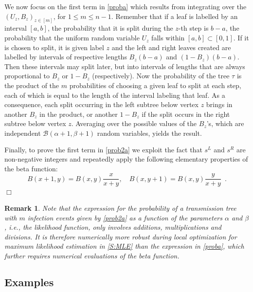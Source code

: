 \documentclass[review]{elsarticle}
\numberwithin{equation}{section}
\let\orgautoref\autoref
\renewcommand{\autoref}
        {\def\equationautorefname{Eq.}%
         \def\figureautorefname{Fig.}%
         \def\subfigureautorefname{Fig.}%
         \def\sectionautorefname{Sect.}%
         \def\subsectionautorefname{Sect.}%
         \def\subsubsectionautorefname{Sect.}%
         \def\Itemautorefname{item}%
         \def\tableautorefname{Table}%
         \def\propositionautorefname{Prop.}%
         \def\corollaryautorefname{Corollary}%
         \def\theoremautorefname{Theorem}%
         \def\remarkautorefname{Remark}%
         \def\lemmaautorefname{Lemma}%
         \def\proofofautorefname{Proof}%
         \def\exampleautorefname{Example}%
         \orgautoref}
\newtheorem{remark}{Remark}%
\begin{document}
We now focus on the first term in \autoref{proba} which results from integrating over the $(U_z,B_z)_{z\in[m]}$, for $1\leq m \leq n-1$.  
Remember that if a leaf is labelled by an interval $[a,b]$, the probability that it is split during the $z$-th step is $b-a$, the probability that the uniform random variable $U_z$ falls within $[a,b]\subset[0,1]$.  
If it is chosen to split, it is given label $z$ and the left and right leaves created are labelled by intervals of respective lengths $B_z(b-a)$ and $(1-B_z)(b-a)$.  
Then these intervals may split later, but into intervals of lengths that are always proportional to $B_z$ or $1-B_z$ (respectively).  
Now the probability of the tree $\tau$ is the product of the $m$ probabilities of choosing a given leaf to split at each step, each of which is equal to the length of the interval labeling that leaf.  
As a consequence, each split occurring in the left subtree below vertex $z$ brings in another $B_z$ in the product, or another $1-B_z$ if the split occurs in the right subtree below vertex $z$.  
Averaging over the possible values of the $B_z$'s, which are independent $\mathcal{B}(\alpha+1,\beta+1)$ random variables, yields the result. 

Finally, to prove the first term in \autoref{prob2a} we exploit the fact that $s^L$ and $s^R$ are non-negative integers and repeatedly apply the following elementary properties of the beta function: 
\begin{equation}\label{E:integerPropBetaFunc}
B(x+1,y)=B(x,y)\frac{x}{x+y}, \quad B(x,y+1)=B(x,y)\frac{y}{x+y} \enspace.
\end{equation}
\hfill $\Box$

\begin{remark}
Note that the expression for the probability of a transmission tree with $m$ infection events given by \autoref{prob2a} as a function of the parameters $\alpha$ and $\beta$, i.e., the likelihood function, only involves additions, multiplications and divisions.  
It is therefore numerically more robust during local optimization for maximum likelihood estimation in \autoref{S:MLE} than the expression in \autoref{proba}, which further requires numerical evaluations of the beta function. 
\end{remark}

\subsection{Examples}\label{S:Examples-betaSplitting}
\end{document}
